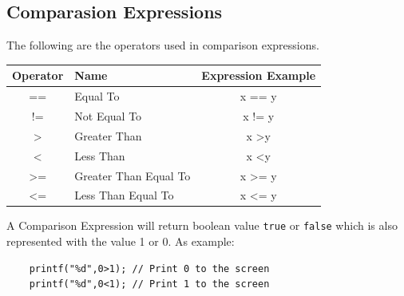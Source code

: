 \subsection{Comparasion Expressions}
The following are the operators used in comparison expressions.
\begin{center}
	\begin{tabular}{|c|l|c|}
		\hline
		Operator        & Name                                 & \multicolumn{1}{l|}{Expression Example} \\ \hline
		==              & Equal To	                             & x == y                       \\ \hline
		!=              & Not Equal To                         & x != y                       \\ \hline
		\textgreater{}  & Greater Than                         & x \textgreater y             \\ \hline
		\textless{}     & Less Than                           & x \textless y                \\ \hline
		\textgreater{}= & Greater Than Equal To		 	 & x \textgreater{}= y          \\ \hline
		\textless{}=    & Less Than Equal To           		 & x \textless{}= y             \\ \hline
	\end{tabular}
\end{center}

A Comparison Expression will return boolean value \verb|true| or \verb|false| which is also represented with the value 1 or 0.
As example:
\begin{verbatim}
    printf("%d",0>1); // Print 0 to the screen
    printf("%d",0<1); // Print 1 to the screen
\end{verbatim}

